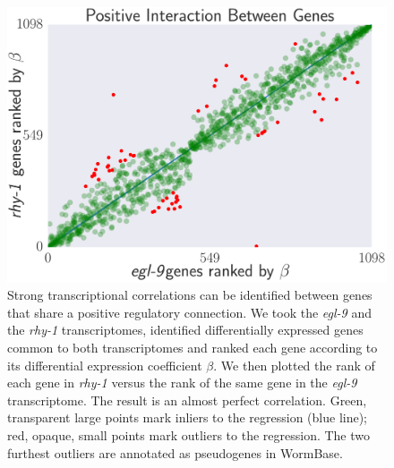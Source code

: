 \documentclass[9pt,twocolumn,twoside]{pnas-new}
\newcommand{\egl}{\emph{egl-9}}
\newcommand{\rhy}{\emph{rhy-1}}
\begin{document}
\begin{figure}%
\centering
\includegraphics[width=\linewidth]{figs/correlative_genetics.pdf}
\caption{
Strong transcriptional correlations can be identified between genes
that share a positive regulatory connection. We took the \egl{} and the \rhy{}
transcriptomes, identified differentially expressed genes common to both
transcriptomes and ranked each gene according to its differential expression
coefficient $\beta$. We then plotted the rank of each gene in \rhy{} versus the
rank of the same gene in the \egl{} transcriptome. The result is an almost
perfect correlation. Green, transparent large points mark inliers to the
regression (blue line); red, opaque, small points mark outliers to the
regression. The two furthest outliers are annotated as pseudogenes in WormBase.
}
\label{fig:genetic_interactions}
\end{figure}
\end{document}
